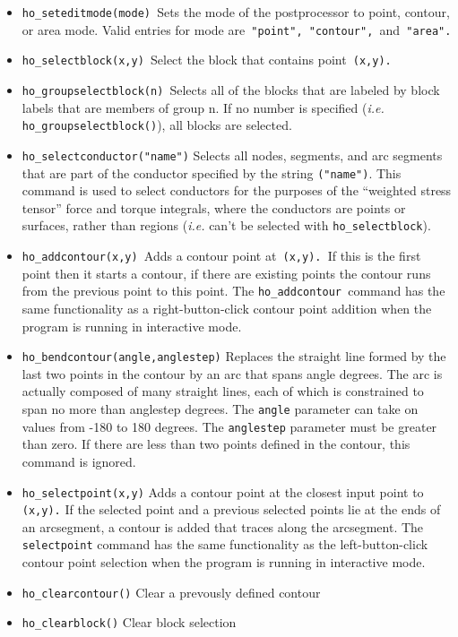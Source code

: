 \begin{itemize}
\item \texttt{ho\_seteditmode(mode) }Sets the mode of the postprocessor to point,
contour, or area mode. Valid entries for mode are\texttt{ "point",
"contour", }and\texttt{ "area". }

\item \texttt{ho\_selectblock(x,y) }Select the block that contains point\texttt{
(x,y).}

\item \texttt{ho\_groupselectblock(n) }Selects all of the blocks that are labeled by
block labels that are members of group n. If no number is specified
({\em i.e.} \texttt{ho\_groupselectblock()}), all blocks are selected.

\item \texttt{ho\_selectconductor("name")} Selects all nodes, segments, and arc
segments that are part of the conductor specified by the string
\texttt{("name")}. This command is used to select conductors for the
purposes of the ``weighted stress tensor'' force and torque
integrals, where the conductors are points or surfaces, rather than
regions ({\em i.e.} can't be selected with \texttt{ho\_selectblock}).

\item \texttt{ho\_addcontour(x,y) }Adds a contour point at\texttt{ (x,y). }If this is
the first point then it starts a contour, if there are existing
points the contour runs from the previous point to this point. The
\texttt{ho\_addcontour }command has the same functionality as a
right-button-click contour point addition when the program is
running in interactive mode.\texttt{ }

\item \texttt{ho\_bendcontour(angle,anglestep)} Replaces the straight line formed by
the last two points in the contour by an arc that spans angle
degrees. The arc is actually composed of many straight lines, each
of which is constrained to span no more than anglestep degrees. The
\texttt{angle} parameter can take on values from -180 to 180
degrees. The \texttt{anglestep} parameter must be greater than
zero. If there are less than two points defined in the contour,
this command is ignored.

\item \texttt{ho\_selectpoint(x,y)} Adds a contour point at the closest input point to
\texttt{(x,y).} If the selected point and a previous selected points lie at
the ends of an arcsegment, a contour is added that traces along the
arcsegment. The \texttt{selectpoint} command has the same
functionality as the left-button-click contour point selection when
the program is running in interactive mode.

\item \texttt{ho\_clearcontour()} Clear a prevously defined contour

\item \texttt{ho\_clearblock()} Clear block selection
\end{itemize}



